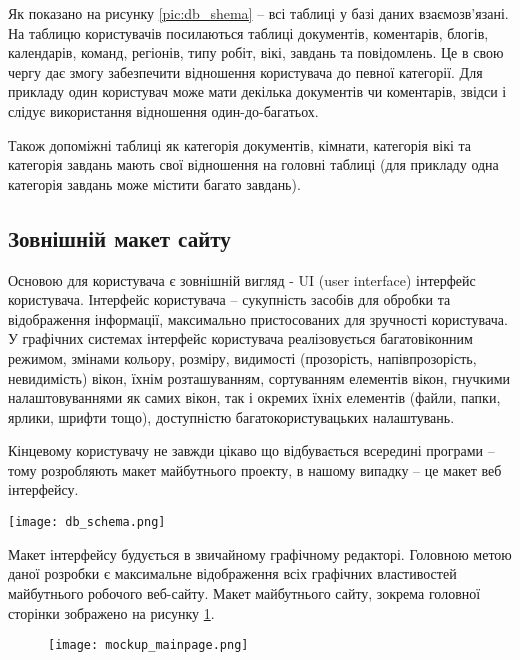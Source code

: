 \par Як показано на рисунку \ref{pic:db_shema} -- всі таблиці у базі даних взаємозв'язані. На таблицю користувачів посилаються таблиці документів, коментарів, блогів, календарів, команд, регіонів, типу робіт, вікі, завдань та повідомлень. 
Це в свою чергу дає змогу забезпечити відношення користувача до певної категорії. 
Для прикладу один користувач може мати декілька документів чи коментарів, звідси і слідує використання відношення один-до-багатьох. 
\par Також допоміжні таблиці як категорія документів, кімнати, категорія вікі та категорія завдань мають свої відношення на головні таблиці (для прикладу одна категорія завдань може містити багато завдань).

\subsection{Зовнішній макет сайту}
Основою для користувача є зовнішній вигляд - UI (user interface) інтерфейс користувача. 
Інтерфейс користувача -- сукупність засобів для обробки та відображення інформації, максимально пристосованих для зручності користувача. У графічних системах інтерфейс користувача реалізовується багатовіконним режимом, змінами кольору, розміру, видимості (прозорість, напівпрозорість, невидимість) вікон, їхнім розташуванням, сортуванням елементів вікон, гнучкими налаштовуваннями як самих вікон, так і окремих їхніх елементів (файли, папки, ярлики, шрифти тощо), доступністю багатокористувацьких налаштувань.

\par Кінцевому користувачу не завжди цікаво що відбувається всередині програми -- тому розробляють макет майбутнього проекту, в нашому випадку -- це макет веб інтерфейсу. 

	\begin{center}
		\texttt{[image: db\_schema.png]}
		\vspace{1pt}
		\label{pic:db_shema}
	\end{center}

\par Макет інтерфейсу будується в звичайному графічному редакторі. Головною метою даної розробки є максимальне відображення всіх графічних властивостей майбутнього робочого веб-сайту. Макет майбутнього сайту, зокрема головної сторінки зображено на рисунку \ref{pic:mockup}.


\begin{figure}[!ht]
\centering
		\texttt{[image: mockup\_mainpage.png]}
		\vspace{18pt}
		\label{pic:mockup}
\end{figure}


